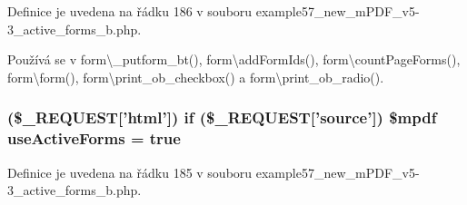 Definice je uvedena na řádku 186 v souboru example57\-\_\-new\-\_\-m\-P\-D\-F\-\_\-v5-\/3\-\_\-active\-\_\-forms\-\_\-b.\-php.



Používá se v form\textbackslash{}\-\_\-putform\-\_\-bt(), form\textbackslash{}add\-Form\-Ids(), form\textbackslash{}count\-Page\-Forms(), form\textbackslash{}form(), form\textbackslash{}print\-\_\-ob\-\_\-checkbox() a form\textbackslash{}print\-\_\-ob\-\_\-radio().

\hypertarget{example57__new__m_p_d_f__v5-3__active__forms__b_8php_a378161bd0fa26b3dc46a75ac7aa2671b}{
\subsubsection[{use\-Active\-Forms}]{ (\$\-\_\-\-R\-E\-Q\-U\-E\-S\-T\mbox{[}'html'\mbox{]}) {\bf if} (\$\-\_\-\-R\-E\-Q\-U\-E\-S\-T\mbox{[}'source'\mbox{]}) \$mpdf use\-Active\-Forms = true}}\label{example57__new__m_p_d_f__v5-3__active__forms__b_8php_a378161bd0fa26b3dc46a75ac7aa2671b}


Definice je uvedena na řádku 185 v souboru example57\-\_\-new\-\_\-m\-P\-D\-F\-\_\-v5-\/3\-\_\-active\-\_\-forms\-\_\-b.\-php.

